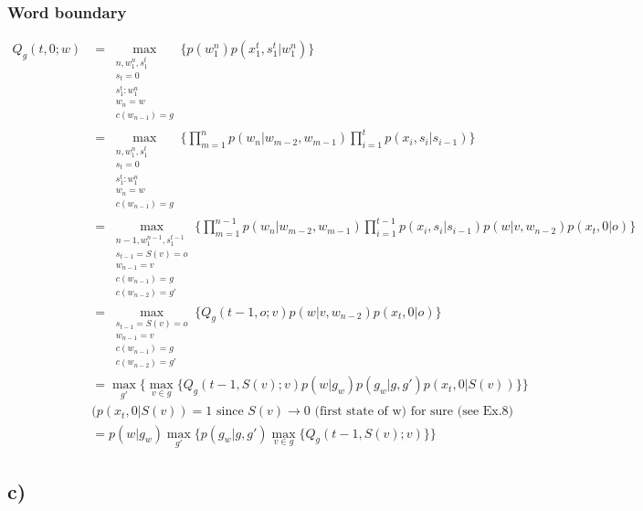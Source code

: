 
\subsubsection*{Word boundary} %
\label{ssub:word_boundary}

\begin{align*}
	Q_g(t,0;w) &= \max_{\substack{n, w_1^n, s_1^{t} \\ s_{t}=0 \\ s_1^{t} : w_1^{n} \\ w_n = w \\ c(w_{n-1}) = g}} \{ p(w_1^n)p(x_1^t, s_1^t | w_1^n)\} \\
			   &= \max_{\substack{n, w_1^n, s_1^{t} \\ s_{t}=0 \\ s_1^{t} : w_1^{n} \\ w_n = w \\ c(w_{n-1}) = g}} \{\prod_{m=1}^n p(w_n|w_{m-2},w_{m-1}) \prod_{i=1}^{t} p(x_i, s_i | s_{i-1})\} \\
			   &= \max_{\substack {n-1, w_1^{n-1}, s_1^{t-1} \\ s_{t-1} = S(v) = o \\ w_{n-1} = v \\ c(w_{n-1}) = g \\ c(w_{n-2}) = g'}} \{\prod_{m=1}^{n-1} p(w_n|w_{m-2},w_{m-1}) \prod_{i=1}^{t-1}p(x_i, s_i | s_{i-1}) p(w | v, w_{n-2}) p(x_t, 0 | o)\} \\
			   &= \max_{\substack {s_{t-1} = S(v) = o \\ w_{n-1} = v \\ c(w_{n-1}) = g \\ c(w_{n-2}) = g'}} \{Q_g(t-1,o;v) p(w | v, w_{n-2}) p(x_t, 0 | o)\} \\
			   &= \max_{g'} \{ \max_{v \in g} \{ Q_g(t-1,S(v);v) p(w|g_w)p(g_w|g,g') p(x_t, 0 | S(v)) \} \} \\
			   & (p(x_t, 0 | S(v)) = 1 \text{ since } S(v) \to 0 \text{ (first state of w) for sure (see Ex.8)} \\ 
			   &= p(w|g_w) \max_{g'} \{ p(g_w|g,g') \max_{v \in g} \{ Q_g(t-1,S(v);v) \} \}
\end{align*}




\subsection*{c)} %
\label{sub:c_}

